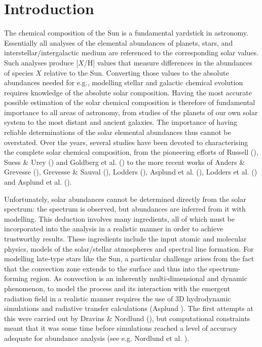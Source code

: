 \documentclass[traditabstract]{aa}
\begin{document}
\section{Introduction}

The chemical composition of the Sun is a fundamental yardstick in astronomy. Essentially all analyses of the elemental abundances of planets, stars, and interstellar/intergalactic medium are referenced to the corresponding solar values.  Such analyses produce [$X$/H] values that measure differences in the abundances of species $X$ relative to the Sun.  Converting those values to the absolute abundances needed for e.g., modelling stellar and galactic chemical evolution requires knowledge of the absolute solar composition.  Having the most accurate possible estimation of the solar chemical composition is therefore of fundamental importance to all areas of astronomy, from studies of the planets of our own solar system to the most distant and ancient galaxies.  The importance of having reliable determinations of the solar elemental abundances thus cannot be overstated. Over the years, several studies have been devoted to characterising the complete solar chemical composition, from the pioneering efforts of Russell (\cite{russell29}), Suess \& Urey (\cite{suess56}) and Goldberg et al. (\cite{goldberg60}) to the more recent works of Anders \& Grevesse (\cite{ag89}), Grevesse \& Sauval (\cite{gs98}), Lodders (\cite{lodd03}), Asplund et al. (\cite{AGS05}), Lodders et al. (\cite{lodd}) and Asplund et al. (\cite{asp8}).

Unfortunately, solar abundances cannot be determined directly from the solar spectrum: the spectrum is observed, but abundances are inferred from it with modelling. This deduction involves many ingredients, all of which must be incorporated into the analysis in a realistic manner in order to achieve trustworthy results.  These ingredients include the input atomic and molecular physics, models of the solar/stellar atmospheres and spectral line formation.  For modelling late-type stars like the Sun, a particular challenge arises from the fact that the convection zone extends to the surface and thus into the spectrum-forming region. As convection is an inherently multi-dimensional and dynamic phenomenon, to model the process and its interaction with the emergent radiation field in a realistic manner requires the use of 3D hydrodynamic simulations and radiative transfer calculations (Asplund \cite{asp7}).  The first attempts at this were carried out by Dravins \& Nordlund (\cite{stell-gran4}), but computational constraints meant that it was some time before simulations reached a level of accuracy adequate for abundance analysis (see e.g. Nordlund et al. \cite{nord}).
\end{document}
